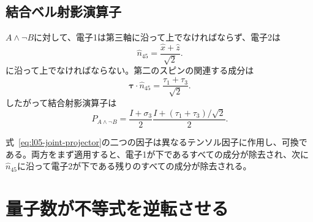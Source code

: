 \subsection{結合ベル射影演算子}

\(A\wedge\neg B\)に対して、電子1は第三軸に沿って上でなければならず、電子2は
\begin{equation}
  \hat n_{45}=\frac{\hat x+\hat z}{\sqrt2}.
\end{equation}
に沿って上でなければならない。第二のスピンの関連する成分は
\begin{equation}
  \boldsymbol{\tau}\cdot\hat n_{45}
  =
  \frac{\tau_1+\tau_3}{\sqrt2}.
\end{equation}
したがって結合射影演算子は
\begin{equation}
  P_{A\wedge\neg B}
  =
  \frac{I+\sigma_3}{2}
  \frac{I+(\tau_1+\tau_3)/\sqrt2}{2}.
  \label{eq:l05-joint-projector}
\end{equation}

\begin{classroomqa}
\end{classroomqa}

\begin{classroomqa}
\end{classroomqa}

式~\eqref{eq:l05-joint-projector}の二つの因子は異なるテンソル因子に作用し、可換である。両方をまず適用すると、電子1が下であるすべての成分が除去され、次に\(\hat n_{45}\)に沿って電子2が下である残りのすべての成分が除去される。

\section{量子数が不等式を逆転させる}


